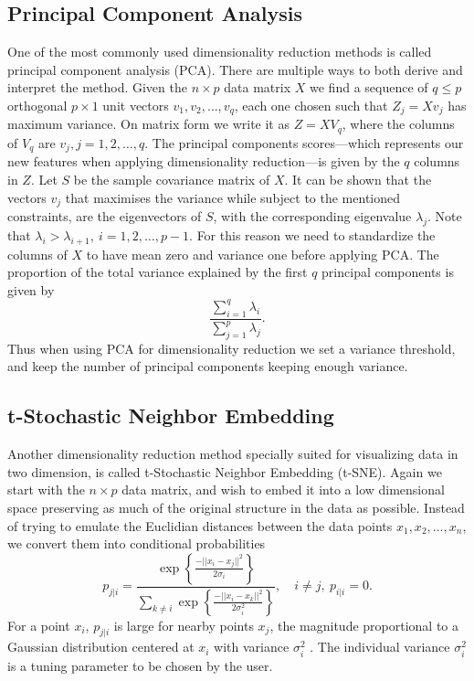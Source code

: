 \documentclass[a4paper]{memoir}
\theoremstyle{plain}
\theoremstyle{definition}
\theoremstyle{remark}
\begin{document}
\subsection{Principal Component Analysis}
One of the most commonly used dimensionality reduction methods is called principal component analysis (PCA).
There are multiple ways to both derive and interpret the method.
Given the $n \times p$ data matrix $X$ we find a sequence of $q \leq p$ orthogonal $p \times 1$ unit vectors $v_1, v_2, \hdots, v_q$, each one chosen such that $Z_j = Xv_j$ has maximum variance.
On matrix form we write it as $Z = X V_q$, where the columns of $V_q$ are $v_j, j = 1, 2, \hdots, q$. 
The principal components scores—which represents our new features when applying dimensionality reduction—is given by the $q$ columns in $Z$.
Let $S$ be the sample covariance matrix of $X$.
It can be shown \cite{jolliffe} that the vectors $v_j$ that maximises the variance while subject to the mentioned constraints, are the eigenvectors of $S$, with the corresponding eigenvalue $\lambda_j$. Note that $\lambda_i > \lambda_{i+1},\ i = 1, 2, \hdots, p-1$.
For this reason we need to standardize the columns of $X$ to have mean zero and variance one before applying PCA.
The proportion of the total variance explained by the first $q$ principal components is given by
\begin{equation*}
        \frac{\sum_{i = 1}^{q}\lambda_i}{\sum_{j = 1}^{p} \lambda_j}.
\end{equation*}
Thus when using PCA for dimensionality reduction we set a variance threshold, and keep the number of principal components keeping enough variance.



\subsection{t-Stochastic Neighbor Embedding}
Another dimensionality reduction method specially suited for visualizing data in two dimension, is called t-Stochastic Neighbor Embedding (t-SNE).
Again we start with the $n \times p$ data matrix, and wish to embed it into a low dimensional space preserving as much of the original structure in the data as possible.
Instead of trying to emulate the Euclidian distances between the data points $x_1, x_2, \hdots, x_n$, we convert them into conditional probabilities 
\begin{equation}\label{eq:gaus}
       p_{j|i} = \frac{\exp \left\{ \frac{-||x_i - x_j||^2}{2\sigma_i} \right\}}{\sum_{k \neq i}^{} \exp \left\{ \frac{-||x_i - x_k||^2}{2\sigma_i^2} \right\}}, \quad i \neq j, \ p_{i|i} = 0. 
\end{equation}
For a point $x_i$, $p_{j|i}$ is large for nearby points $x_j$, the magnitude proportional to a Gaussian distribution centered at $x_i$ with variance $\sigma_i^2$ \cite{hinton}.
The individual variance $\sigma_i^2$ is a tuning parameter to be chosen by the user.
\end{document}
